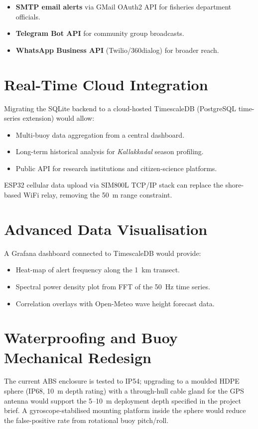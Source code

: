 \begin{itemize}
  \item \textbf{SMTP email alerts} via GMail OAuth2 API for fisheries department
        officials.
  \item \textbf{Telegram Bot API} for community group broadcasts.
  \item \textbf{WhatsApp Business API} (Twilio/360dialog) for broader reach.
\end{itemize}

\section{Real-Time Cloud Integration}

Migrating the SQLite backend to a cloud-hosted TimescaleDB (PostgreSQL time-series
extension) would allow:
\begin{itemize}
  \item Multi-buoy data aggregation from a central dashboard.
  \item Long-term historical analysis for \textit{Kallakkadal} season profiling.
  \item Public API for research institutions and citizen-science platforms.
\end{itemize}
ESP32 cellular data upload via SIM800L TCP/IP stack can replace the shore-based WiFi
relay, removing the 50~m range constraint.

\section{Advanced Data Visualisation}

A Grafana dashboard connected to TimescaleDB would provide:
\begin{itemize}
  \item Heat-map of alert frequency along the 1~km transect.
  \item Spectral power density plot from FFT of the 50~Hz time series.
  \item Correlation overlays with Open-Meteo wave height forecast data.
\end{itemize}

\section{Waterproofing and Buoy Mechanical Redesign}

The current ABS enclosure is tested to IP54; upgrading to a moulded HDPE sphere
(IP68, 10~m depth rating) with a through-hull cable gland for the GPS antenna would
support the 5--10~m deployment depth specified in the project brief.
A gyroscope-stabilised mounting platform inside the sphere would reduce the
false-positive rate from rotational buoy pitch/roll.
